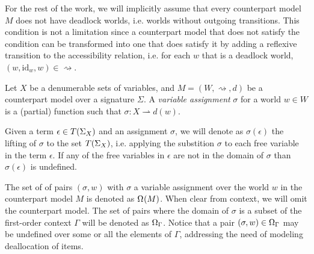 For the rest of the work, we will implicitly assume that every counterpart model $M$ does not have deadlock worlds, i.e.
worlds without outgoing transitions. This condition is not a limitation since a counterpart model that does not satisfy
the condition can be transformed into one that does satisfy it by adding a reflexive transition to the accessibility
relation, i.e. for each $w$ that is a deadlock world, $(w, \text{id}_w, w) \in \rightsquigarrow$.

\begin{definition}
  Let $X$ be a denumerable sets of variables, and $M = (W, \rightsquigarrow, d)$ be a counterpart model over a signature
  $\Sigma$. A \emph{variable assignment} $\sigma$ for a world $w \in W$ is a (partial) function such that $\sigma : X
  \rightharpoonup d(w)$.
\end{definition}

Given a term $\epsilon \in T({\Sigma}_{X})$ and an assignment $\sigma$, we will denote as
$\sigma(\epsilon)$ the lifting of $\sigma$ to the set $T({\Sigma}_{X})$, i.e. applying the substition $\sigma$ to each
free variable in the term $\epsilon$. If any of the free
variables in $\epsilon$ are not in the domain of $\sigma$ than $\sigma(\epsilon)$ is undefined.

The set of of pairs $(\sigma, w)$ with $\sigma$ a variable assignment over the world $w$ in the counterpart model $M$ is
denoted as $\Omega_{}(M)$. When clear from context, we will omit the counterpart model. The set of pairs where the
domain of $\sigma$ is a subset of the first-order context $\Gamma$ will be denoted as $\Omega_{\Gamma}$.
Notice that a pair $(\sigma, w) \in \Omega_{\Gamma}$ may be undefined over some or all the elements of $\Gamma$,
addressing the need of modeling deallocation of items.
